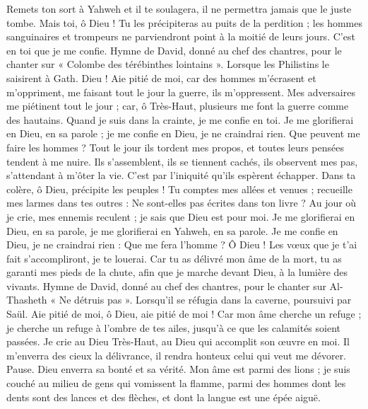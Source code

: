 \begin{multicols}{2}
Remets ton sort à Yahweh et il te soulagera, il ne permettra jamais que le juste tombe.
Mais toi, ô Dieu ! Tu les précipiteras au puits de la perdition ; les hommes sanguinaires et trompeurs ne parviendront point à la moitié de leurs jours. C’est en toi que je me confie.
\VerseOne{}Hymne de David, donné au chef des chantres, pour le chanter sur « Colombe des térébinthes lointains ». Lorsque les Philistins le saisirent à Gath.
Dieu ! Aie pitié de moi, car des hommes m’écrasent et m'oppriment, me faisant tout le jour la guerre, ils m’oppressent.
Mes adversaires me piétinent tout le jour ; car, ô Très-Haut, plusieurs me font la guerre comme des hautains.
Quand je suis dans la crainte, je me confie en toi.
Je me glorifierai en Dieu, en sa parole ; je me confie en Dieu, je ne craindrai rien. Que peuvent me faire les hommes ?
Tout le jour ils tordent mes propos, et toutes leurs pensées tendent à me nuire.
Ils s'assemblent, ils se tiennent cachés, ils observent mes pas, s’attendant à m’ôter la vie.
C’est par l’iniquité qu’ils espèrent échapper. Dans ta colère, ô Dieu, précipite les peuples !
Tu comptes mes allées et venues ; recueille mes larmes dans tes outres : Ne sont-elles pas écrites dans ton livre ?
Au jour où je crie, mes ennemis reculent ; je sais que Dieu est pour moi.
Je me glorifierai en Dieu, en sa parole, je me glorifierai en Yahweh, en sa parole.
Je me confie en Dieu, je ne craindrai rien : Que me fera l'homme ?
Ô Dieu ! Les vœux que je t’ai fait s’accompliront, je te louerai.
Car tu as délivré mon âme de la mort, tu as garanti mes pieds de la chute, afin que je marche devant Dieu, à la lumière des vivants.
\VerseOne{}Hymne de David, donné au chef des chantres, pour le chanter sur Al-Thasheth « Ne détruis pas ». Lorsqu’il se réfugia dans la caverne, poursuivi par Saül.
Aie pitié de moi, ô Dieu, aie pitié de moi ! Car mon âme cherche un refuge ; je cherche un refuge à l'ombre de tes ailes, jusqu'à ce que les calamités soient passées.
Je crie au Dieu Très-Haut, au Dieu qui accomplit son œuvre en moi.
Il m’enverra des cieux la délivrance, il rendra honteux celui qui veut me dévorer. Pause. Dieu enverra sa bonté et sa vérité.
Mon âme est parmi des lions ; je suis couché au milieu de gens qui vomissent la flamme, parmi des hommes dont les dents sont des lances et des flèches, et dont la langue est une épée aiguë.

\end{multicols}
